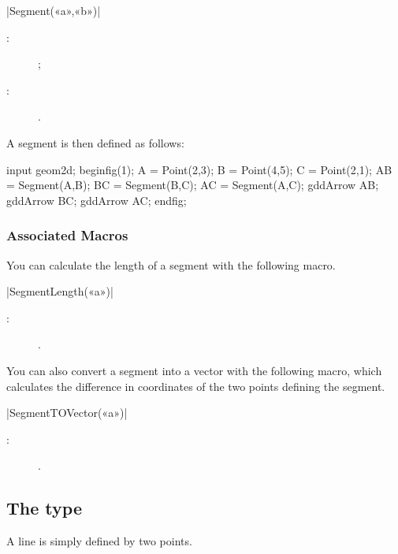 \documentclass[a4paper,english]{article}
\begin{document}
\begin{colourband}
\macro|Segment(«a»,«b»)|
\begin{description}
  \item[:]   ;
  \item[:]  .
\end{description}
\end{colourband}

\bigskip

A segment is then defined as follows:
\begin{ExempleMP}
input geom2d;
beginfig(1);
A = Point(2,3);
B = Point(4,5);
C = Point(2,1);
AB = Segment(A,B);
BC = Segment(B,C);
AC = Segment(A,C);
gddArrow AB;
gddArrow BC;
gddArrow AC;
endfig;
\end{ExempleMP}

\subsubsection{Associated Macros}

You can calculate the length of a segment with the following macro.
\begin{colourband}
\macro|SegmentLength(«a»)|
\begin{description}
  \item[:]  .
\end{description}
\end{colourband}

You can also convert a segment into a vector with the following macro, which calculates the difference in coordinates of the two points defining the segment.
\begin{colourband}
\macro|SegmentTOVector(«a»)|
\begin{description}
  \item[:]  .
\end{description}
\end{colourband}



\subsection{The  type}
A line is simply defined by two points.
\end{document}
